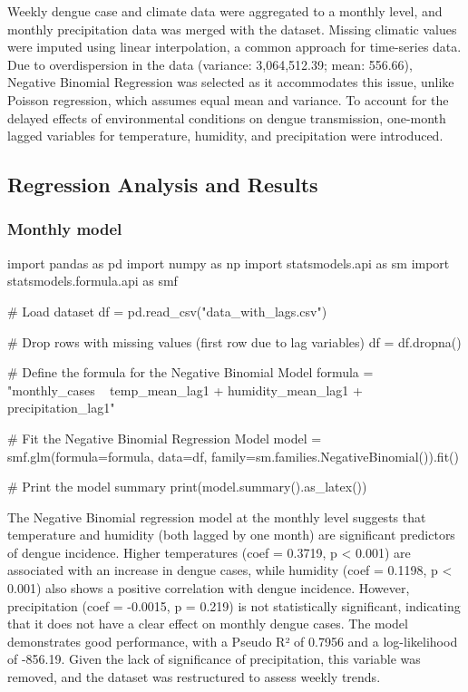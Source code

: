 \documentclass{article}
\begin{document}
Weekly dengue case and climate data were aggregated to a monthly level, and monthly precipitation data was merged with the dataset. Missing climatic values were imputed using linear interpolation, a common approach for time-series data. Due to overdispersion in the data (variance: 3,064,512.39; mean: 556.66), Negative Binomial Regression was selected as it accommodates this issue, unlike Poisson regression, which assumes equal mean and variance. To account for the delayed effects of environmental conditions on dengue transmission, one-month lagged variables for temperature, humidity, and precipitation were introduced.

\subsection*{Regression Analysis and Results}

\subsubsection*{Monthly model}

\begin{pycode}
import pandas as pd
import numpy as np
import statsmodels.api as sm
import statsmodels.formula.api as smf

# Load dataset
df = pd.read_csv("data_with_lags.csv") 

# Drop rows with missing values (first row due to lag variables)
df = df.dropna()

# Define the formula for the Negative Binomial Model
formula = "monthly_cases ~ temp_mean_lag1 + humidity_mean_lag1 + precipitation_lag1"

# Fit the Negative Binomial Regression Model
model = smf.glm(formula=formula, data=df, family=sm.families.NegativeBinomial()).fit()

# Print the model summary
print(model.summary().as_latex())

\end{pycode}

The Negative Binomial regression model at the monthly level suggests that temperature and humidity (both lagged by one month) are significant predictors of dengue incidence. Higher temperatures (coef = 0.3719, p < 0.001) are associated with an increase in dengue cases, while humidity (coef = 0.1198, p < 0.001) also shows a positive correlation with dengue incidence. However, precipitation (coef = -0.0015, p = 0.219) is not statistically significant, indicating that it does not have a clear effect on monthly dengue cases. The model demonstrates good performance, with a Pseudo R² of 0.7956 and a log-likelihood of -856.19. Given the lack of significance of precipitation, this variable was removed, and the dataset was restructured to assess weekly trends.
\end{document}
